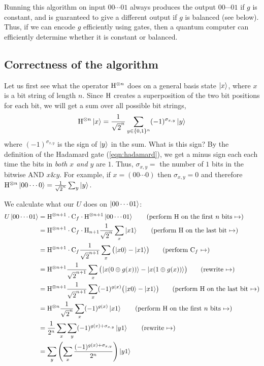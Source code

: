 Running this algorithm on input $00\cdots01$ always produces the output $00\cdots01$ if $g$ is constant,
and is guaranteed to give a different output if $g$ is balanced (see below).
Thus, if we can encode $g$ efficiently using gates, then a quantum computer can efficiently determine whether it is constant or balanced.

\subsection{Correctness of the algorithm}

Let us first see what the operator $\mathrm{H}^{\otimes n}$ does on a general basis state $\ket{x}$, where $x$ is a bit string of length $n$.
Since $\mathrm{H}$ creates a superposition of the two bit positions for each bit, we will get a sum over all possible bit strings,
\begin{align*}
  \mathrm{H}^{\otimes n} \ket{x} = \frac{1}{\sqrt{2}^n} \sum_{y \in \{0,1\}^n} (-1)^{\sigma_{x,y}} \ket{y}
\end{align*}
where $(-1)^{\sigma_{x,y}}$ is the sign of $\ket{y}$ in the sum.
What is this sign?
By the definition of the Hadamard gate (\ref{eqn:hadamard}), we get a minus sign each each time the bits in \emph{both $x$ and $y$} are $1$.
Thus, $\sigma_{x,y} =$ the number of $1$ bits in the bitwise AND $x \& y$.
For example, if $x = (00\cdots0)$ then $\sigma_{x,y} = 0$ and therefore $\mathrm{H}^{\otimes n} \ket{00\cdots0} = \frac{1}{\sqrt{2}^n} \sum_y \ket{y}$.

\newcommand{\nexttag}[1]{\tag{#1 $\mapsto$}}

We calculate what our $U$ does on $\ket{00\cdots01}$:
\begin{align*}
  U\ket{00\cdots01} &= \Ha^{\otimes n+1} \cdot \Cl_f \cdot \Ha^{\otimes n+1} \ket{00\cdots01} \nexttag{perform $\Ha$ on the first $n$ bits}\\
  &= \Ha^{\otimes n+1} \cdot \Cl_f \cdot \Ha_{n+1} \frac{1}{\sqrt{2}^n} \sum_x \ket{x1} \nexttag{perform $\Ha$ on the last bit}\\
  &= \Ha^{\otimes n+1} \cdot \Cl_f \frac{1}{\sqrt{2}^{n+1}} \sum_x \kets{\ket{x0} - \ket{x1}} \nexttag{perform $\Cl_f$}\\
  &= \Ha^{\otimes n+1} \frac{1}{\sqrt{2}^{n+1}} \sum_x \kets{\ket{x(0 \oplus g(x))} - \ket{x(1 \oplus g(x))}} \nexttag{rewrite}\\
  &= \Ha^{\otimes n+1} \frac{1}{\sqrt{2}^{n+1}} \sum_x (-1)^{g(x)}\kets{\ket{x0} - \ket{x1}} \nexttag{perform $\Ha$ on the last bit}\\
  &= \Ha^{\otimes n} \frac{1}{\sqrt{2}^{n}} \sum_x (-1)^{g(x)}\ket{x1} \nexttag{perform $\Ha$ on the first $n$ bits}\\
  &= \frac{1}{2^n} \sum_x \sum_y (-1)^{g(x)+\sigma_{x,y}}\ket{y1} \nexttag{rewrite}\\
  &= \sum_y \left(\sum_x \frac{(-1)^{g(x)+\sigma_{x,y}}}{2^n}\right)\ket{y1}
\end{align*}

